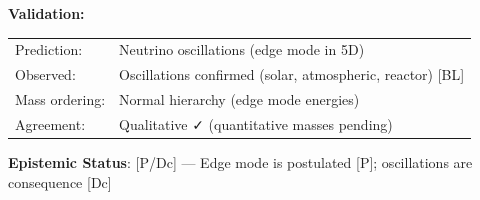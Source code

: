 \begin{tcolorbox}[colback=blue!5,
                  colframe=blue!75!black,
                  title=\textbf{5D Mechanism: Neutrino as Edge Mode},
                  fonttitle=\bfseries,
                  boxrule=2pt]
\textbf{Validation:}

\begin{tabular}{ll}
Prediction: & Neutrino oscillations (edge mode in 5D) \\
Observed: & Oscillations confirmed (solar, atmospheric, reactor) [BL] \\
Mass ordering: & Normal hierarchy (edge mode energies) \\
Agreement: & Qualitative ✓ (quantitative masses pending) \\
\end{tabular}

\textbf{Epistemic Status}: [P/Dc] — Edge mode is postulated [P]; oscillations are consequence [Dc]

\end{tcolorbox}








